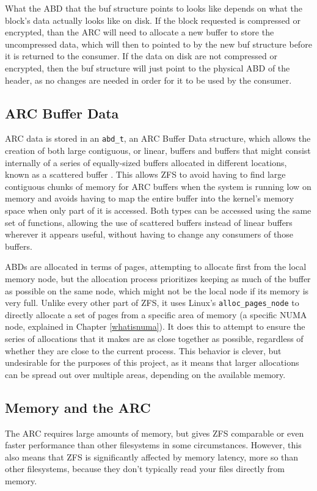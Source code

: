 What the ABD that the buf structure points to looks like depends on what the block's data actually looks like on disk.
If the block requested is compressed or encrypted, than the ARC will need to allocate a new buffer to store the uncompressed data,
which will then to pointed to by the new buf structure before it is returned to the consumer.
If the data on disk are not compressed or encrypted, then the buf structure will just point to the physical ABD of the header,
as no changes are needed in order for it to be used by the consumer.

\subsection{ARC Buffer Data}
\label{chapter:ABD}
ARC data is stored in an \texttt{abd\_t}, an ARC Buffer Data structure, which allows the creation of both
large contiguous, or linear, buffers and buffers that might consist internally of a series of equally-sized buffers allocated in different locations, 
known as a scattered buffer \cite[{module/zfs/abd.c}]{zfs}.
This allows ZFS to avoid having to find large contiguous chunks of memory for ARC buffers when the system is running low on memory 
and  avoids having to map the entire buffer into the kernel's memory space when only part of it is accessed.
Both types can be accessed using the same set of functions, allowing the use of scattered buffers instead of linear buffers
wherever it appears useful, without having to change any consumers of those buffers.

ABDs are allocated in terms of pages, attempting to allocate first from the local memory node, 
but the allocation process prioritizes keeping as much of the 
buffer as possible on the same node, which might not be the local node if its memory is very full.
Unlike every other part of ZFS, it uses Linux's \texttt{alloc\_pages\_node} to directly allocate a set of pages
from a specific area of memory (a specific NUMA node, explained in Chapter \ref{whatisnuma}).
It does this to attempt to ensure the series of allocations that it makes are as close together as possible,
regardless of whether they are close to the current process.
This behavior is clever, but undesirable for the purposes of this project, as it means that larger allocations
can be spread out over multiple areas, depending on the available memory.

\subsection{Memory and the ARC}
The ARC requires large amounts of memory, but gives ZFS comparable or even faster performance than other filesystems in some 
circumstances.
However, this also means that ZFS is significantly affected by memory latency, more so than other filesystems, because they don't typically 
read your files directly from memory.

